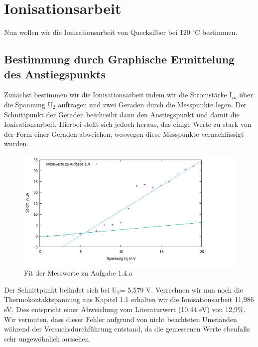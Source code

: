 \section{Ionisationsarbeit}
Nun wollen wir die Ionisationsarbeit von Quecksilber bei 120 $ ^\circ $C bestimmen.
\subsection{Bestimmung durch Graphische Ermittelung des Anstiegspunkts}
Zunächst bestimmen wir die Ionisationsarbeit indem wir die Stromstärke I$ _{in} $ über die Spannung U$ _2 $ auftragen und zwei Geraden durch die Messpunkte legen. Der Schnittpunkt der Geraden beschreibt dann den Anstiegspunkt und damit die Ionisationsarbeit. Hierbei stellt sich jedoch heraus, das einige Werte zu stark von der Form einer Geraden abweichen, weswegen diese Messpunkte vernachlässigt wurden. 
\begin{figure}
	\includegraphics[width=\textwidth]{../Daten/Aufgabe1/Aufgabe1_4.png}
	\caption{Fit der Messwerte zu Aufgabe 1.4.a}
\end{figure}

Der Schnittpunkt befindet sich bei U$ _2 $= 5,579 V. Verrechnen wir nun noch die Thermokontaktspannung aus Kapitel 1.1 erhalten wir die Ionisationsarbeit 11,986 eV. Dies entspricht einer Abweichung vom Literaturwert (10,44 eV) von 12,9\%. Wir vermuten, dass dieser Fehler aufgrund von nicht beachteten Umständen während der Versuchsdurchführung entstand, da die gemessenen Werte ebenfalls sehr ungewöhnlich aussehen.
